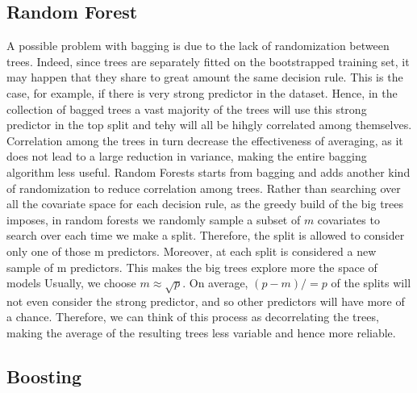 \documentclass[a4paper,11pt]{article}
\begin{document}
\subsection{Random Forest}
A possible problem with bagging is due to the lack of randomization between trees. Indeed, since trees are separately fitted on the bootstrapped training set, it may happen that they share to great amount the same decision rule. This is the case, for example, if there is very strong predictor in the dataset. Hence, in the collection of bagged trees a vast majority of the trees will use this strong predictor in the top split and tehy will all be hihgly correlated among themselves.
\\Correlation among the trees in turn decrease the effectiveness of averaging, as it does not lead to a large reduction in variance, making the entire bagging algorithm less useful. 
 Random Forests starts from bagging and adds another kind of randomization to reduce correlation among trees. Rather than searching over all the covariate space for each decision rule, as the greedy build of the big trees imposes, in random forests we randomly sample a subset of $m$ covariates to search over each time we make a split. Therefore, the split is allowed to consider only one of those m predictors. Moreover, at each split is considered a new sample of m predictors. This makes the big trees explore more the space of models
Usually, we choose $m \approx \sqrt{p}$.
On average, $(p - m)/ = p$ of the splits will not even consider the strong predictor, and so other predictors will have more of a chance. Therefore, we can think of this process as decorrelating the trees, making the average of the resulting trees less variable and hence more reliable.


\subsection{Boosting}
\end{document}
